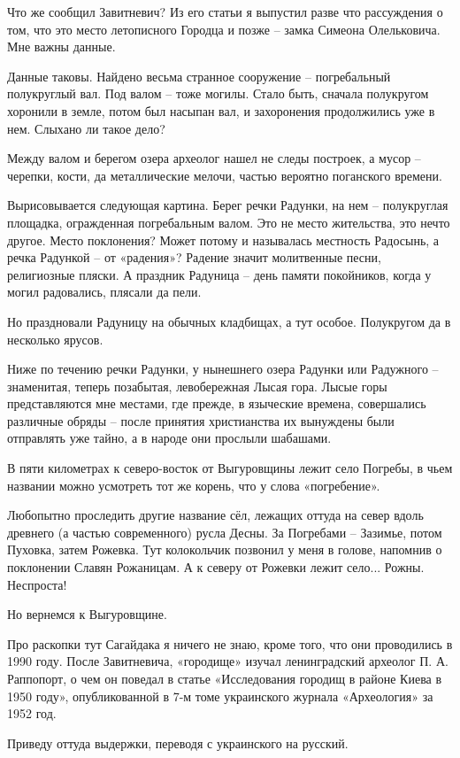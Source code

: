 Что же сообщил Завитневич? Из его статьи я выпустил разве что рассуждения о том, что это место летописного Городца и позже – замка Симеона Олельковича. Мне важны данные. 

Данные таковы. Найдено весьма странное сооружение – погребальный полукруглый вал. Под валом – тоже могилы. Стало быть, сначала полукругом хоронили в земле, потом был насыпан вал, и захоронения продолжились уже в нем. Слыхано ли такое дело?

Между валом и берегом озера археолог нашел не следы построек, а мусор – черепки, кости, да металлические мелочи, частью вероятно поганского времени.

Вырисовывается следующая картина. Берег речки Радунки, на нем – полукруглая площадка, огражденная погребальным валом. Это не место жительства, это нечто другое. Место поклонения? Может потому и называлась местность Радосынь, а речка Радункой – от «радения»? Радение значит молитвенные песни, религиозные пляски. А праздник Радуница – день памяти покойников, когда у могил радовались, плясали да пели.

Но праздновали Радуницу на обычных кладбищах, а тут особое. Полукругом да в несколько ярусов.

Ниже по течению речки Радунки, у нынешнего озера Радунки или Радужного – знаменитая, теперь позабытая, левобережная Лысая гора. Лысые горы представляются мне местами, где прежде, в языческие времена, совершались различные обряды – после принятия христианства их вынуждены были отправлять уже тайно, а в народе они прослыли шабашами.

В пяти километрах к северо-восток от Выгуровщины лежит село Погребы, в чьем названии можно усмотреть тот же корень, что у слова «погребение».

Любопытно проследить другие название сёл, лежащих оттуда на север вдоль древнего (а частью современного) русла Десны. За Погребами – Зазимье, потом Пуховка, затем Рожевка. Тут колокольчик позвонил у меня в голове, напомнив о поклонении Славян Рожаницам. А к северу от Рожевки лежит село... Рожны. Неспроста!

Но вернемся к Выгуровщине. 

Про раскопки тут Сагайдака я ничего не знаю, кроме того, что они проводились в 1990 году. После Завитневича, «городище» изучал ленинградский археолог П. А. Раппопорт, о чем он поведал в статье «Исследования городищ в районе Киева в 1950 году», опубликованной в 7-м томе украинского журнала «Археология» за 1952 год.

Приведу оттуда выдержки, переводя с украинского на русский.

